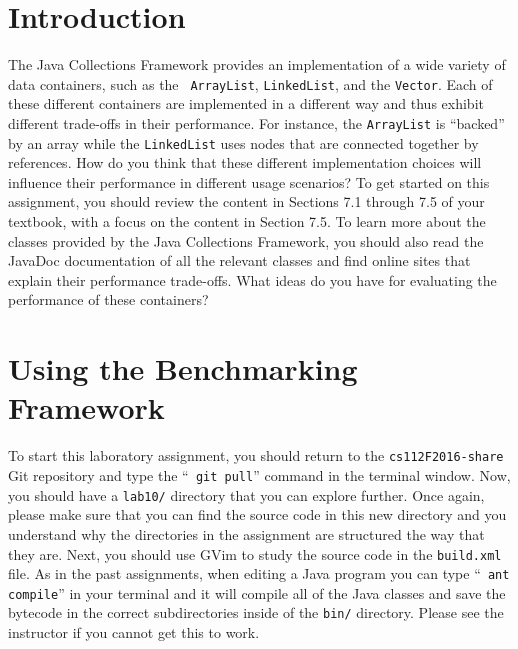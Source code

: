 

\usepackage[compact]{titlesec}


\section*{Introduction}

The Java Collections Framework provides an implementation of a wide variety of data containers, such as the {\tt
ArrayList}, {\tt LinkedList}, and the {\tt Vector}. Each of these different containers are implemented in a different
way and thus exhibit different trade-offs in their performance. For instance, the {\tt ArrayList} is ``backed'' by an
array while the {\tt LinkedList} uses nodes that are connected together by references. How do you think that these
different implementation choices will influence their performance in different usage scenarios? To get started on this
assignment, you should review the content in Sections 7.1 through 7.5 of your textbook, with a focus on the content in
Section 7.5. To learn more about the classes provided by the Java Collections Framework, you should also read the
JavaDoc documentation of all the relevant classes and find online sites that explain their performance trade-offs. What
ideas do you have for evaluating the performance of these containers?

\section*{Using the Benchmarking Framework}

To start this laboratory assignment, you should return to the {\tt cs112F2016-share} Git repository and type the ``{\tt
git pull}'' command in the terminal window.  Now, you should have a {\tt lab10/} directory that you can explore further.
Once again, please make sure that you can find the source code in this new directory and you understand why the
directories in the assignment are structured the way that they are. Next, you should use GVim to study the source code
in the {\tt build.xml} file.  As in the past assignments, when editing a Java program you can type ``{\tt
ant compile}'' in your terminal and it will compile all of the Java classes and save the bytecode in the correct
subdirectories inside of the {\tt bin/} directory.  Please see the instructor if you cannot get this to work.

